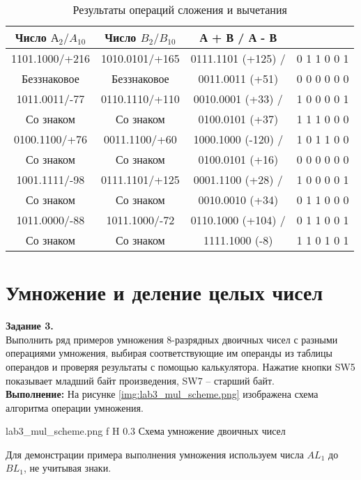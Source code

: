 \documentclass{bmstu}
\begin{document}
\begin{table}[H]
\caption{Результаты операций сложения и вычетания}
\label{table:sub_table}
\begin{tabular}{| c | c | c | c |}
	\hline
		Число $ А_2 / A_{10}$ & Число $ B_2/B_{10}$ & А + В / А - В & \text{Признаки: H S V N Z C} \\	
	\hline
		1101.1000/+216 & 1010.0101/+165 & 0111.1101 (+125) / & 0 1  1 0  0 1 \\
		Беззнаковое & Беззнаковое & 0011.0011 (+51) & 0 0  0 0  0 0 \\
	\hline
		1011.0011/-77 & 0110.1110/+110 & 0010.0001 (+33) / & 1 0  0 0  0 1 \\
		Со знаком & Со знаком & 0100.0101 (+37) & 1 1  1 0  0 0 \\
	\hline
		0100.1100/+76 & 0011.1100/+60 & 1000.1000 (-120) /  & 1 0  1 1  0 0 \\
		Со знаком & Со знаком & 0100.0101 (+16) & 0 0  0 0  0 0 \\
	\hline
		1001.1111/-98 & 0111.1101/+125 & 0001.1100 (+28) / &  1 0 0 0 0 1\\
		Со знаком & Со знаком & 0010.0010 (+34) & 0 1  1 0  0 0 \\
	\hline
		1011.0000/-88 & 1011.1000/-72 & 0110.1000 (+104) / & 0 1  1 0  0 1 \\
		Со знаком & Со знаком & 1111.1000 (-8) & 1 1  0 1  0 1 \\
	\hline
\end{tabular}
\end{table}

\chapter{Умножение и деление целых чисел}
\textbf{Задание 3.} \\
Выполнить ряд примеров умножения 8-разрядных двоичных чисел с разными операциями умножения, выбирая 
соответствующие им операнды из таблицы операндов и проверяя результаты с помощью калькулятора. Нажатие кнопки SW5 
показывает младший байт произведения, SW7 – старший байт.
\\
\textbf{Выполнение:}
На рисунке \ref{img:lab3_mul_scheme.png} изображена схема алгоритма операции умножения.

	{lab3_mul_scheme.png}
	{f}
	{H}
	{0.3\textwidth}
	{Схема умножение двоичных чисел}

Для демонстрации примера выполнения умножения используем числа $AL_1$ до $BL_1$, не учитывая знаки.
\end{document}
